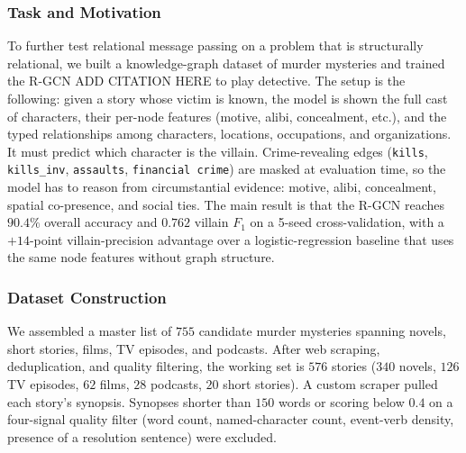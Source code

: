 \documentclass[11pt]{article}
\theoremstyle{definition}
\begin{document}
\subsubsection{Task and Motivation}
To further test relational message passing on a problem that is structurally relational, we built a knowledge-graph dataset of murder mysteries and trained the R-GCN \cite{} ADD CITATION HERE to play detective. The setup is the following: given a story whose victim is known, the model is shown the full cast of characters, their per-node features (motive, alibi, concealment, etc.), and the typed relationships among characters, locations, occupations, and organizations. It must predict which character is the villain. Crime-revealing edges (\texttt{kills}, \texttt{kills\_inv}, \texttt{assaults}, \texttt{financial crime}) are masked at evaluation time, so the model has to reason from circumstantial evidence: motive, alibi, concealment, spatial co-presence, and social ties. The main result is that the R-GCN reaches $90.4\%$ overall accuracy and $0.762$ villain $F_1$ on a 5-seed cross-validation, with a $+14$-point villain-precision advantage over a logistic-regression baseline that uses the same node features without graph structure.

\subsubsection{Dataset Construction}
We assembled a master list of $755$ candidate murder mysteries spanning novels, short stories, films, TV episodes, and podcasts. After web scraping, deduplication, and quality filtering, the working set is $576$ stories ($340$ novels, $126$ TV episodes, $62$ films, $28$ podcasts, $20$ short stories). A custom scraper pulled each story's synopsis. Synopses shorter than $150$ words or scoring below $0.4$ on a four-signal quality filter (word count, named-character count, event-verb density, presence of a resolution sentence) were excluded.
\end{document}
